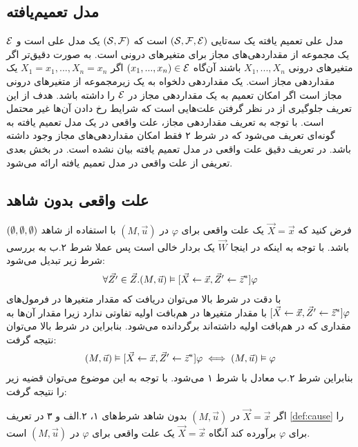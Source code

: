 \subsection{مدل تعمیم‌یافته}
مدل علی تعمیم یافته
یک سه‌تایی
$(\mathcal{S},\mathcal{F},\mathcal{E})$
است که
$(\mathcal{S},\mathcal{F})$
یک مدل علی است و
$\mathcal{E}$
یک مجموعه از مقداردهی‌های مجاز
برای متغیر‌های درونی است.
به صورت دقیق‌تر اگر متغیر‌های درونی
$X_1,...,X_n$
باشند آن‌گاه
$(x_1,...,x_n) \in \mathcal{E}$
اگر
$X_1=x_1,...,X_n=x_n$
یک مقداردهی مجاز است.
یک مقداردهی دلخواه به یک زیرمجموعه از متغیر‌های درونی مجاز است اگر امکان تعمیم به یک مقداردهی مجاز در
$\mathcal{E}$
را داشته باشد.
هدف از این تعریف جلوگیری از در نظر گرفتن علت‌هایی است که شرایط رخ دادن آن‌ها غیر محتمل است.
با توجه به تعریف مقداردهی مجاز، علت واقعی در یک مدل تعمیم یافته به گونه‌ای تعریف می‌شود که در شرط ۲ فقط امکان مقداردهی‌های مجاز وجود داشته باشد.
در
\cite{hp}
تعریف دقیق علت واقعی در مدل تعمیم یافته بیان نشده است.
در بخش بعدی تعریفی از علت واقعی در مدل تعمیم یافته ارائه می‌شود.

\subsection{علت واقعی بدون شاهد}
فرض کنید که
$\vec X = \vec x$
یک علت واقعی برای
$\varphi$
در
$(M,\vec u)$
با استفاده از شاهد
$(\emptyset,\emptyset,\emptyset)$
باشد.
با توجه به اینکه در اینجا
$\vec W$
یک بردار خالی است پس عملا شرط ۲.ب به بررسی شرط زیر تبدیل می‌شود:
\begin{align*}
      \forall \vec{Z'}\in \vec{Z}.
      (M,\vec{u})\vDash [\vec X\leftarrow\vec x,\vec{Z}'\leftarrow \vec{z}^*]\varphi
\end{align*}
با دقت در شرط بالا می‌توان دریافت که مقدار متغیر‌ها در فرمول‌های
$[\vec X\leftarrow\vec x,\vec{Z}'\leftarrow \vec{z}^*]\varphi $
با مقدار متغیر‌ها در هم‌بافت اولیه تفاوتی ندارد زیرا مقدار آن‌ها به مقداری که در هم‌بافت اولیه داشته‌اند برگردانده می‌شود.
بنابراین در شرط بالا می‌توان نتیجه گرفت:
\begin{align*}
      (M,\vec{u})\vDash [\vec X\leftarrow\vec x,\vec{Z}'\leftarrow \vec{z}^*]\varphi 
      \iff (M,\vec{u}) \vDash \varphi
\end{align*}
بنابراین شرط ۲.ب معادل با شرط ۱ می‌شود.
با توجه به این موضوع می‌توان قضیه زیر را نتیجه گرفت:
\begin{proposition}
     اگر 
     $\vec X = \vec x$
     در 
     $(M,\vec u)$
     بدون شاهد 
     شرط‌های ۱، ۲.الف و ۳ در تعریف 
     \ref{def:cause}
     را برای 
     $\varphi$
     برآورده کند آنگاه 
     $\vec X = \vec x$
     یک علت واقعی برای 
     $\varphi$
     در 
     $(M,\vec u)$
     است.
\end{proposition}

